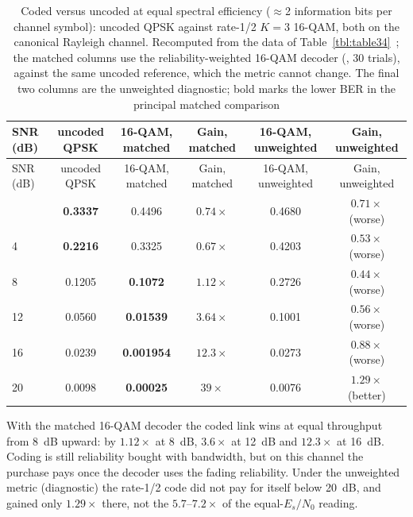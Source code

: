 {\small\setlength{\tabcolsep}{2pt}\begin{longtable}[]{@{}lccccc@{}}
\caption[Coded versus uncoded at equal spectral efficiency]{Coded versus uncoded at equal spectral efficiency ($\approx$2 information bits per channel symbol): uncoded QPSK against rate-1/2 $K{=}3$ 16-QAM, both on the canonical Rayleigh channel. Recomputed from the data of Table~\ref{tbl:table34}~; the matched columns use the reliability-weighted 16-QAM decoder (, 30 trials), against the same uncoded reference, which the metric cannot change. The final two columns are the unweighted diagnostic; bold marks the lower BER in the principal matched comparison}\label{tbl:table40}\tabularnewline
\toprule\noalign{}
SNR (dB) & uncoded QPSK & 16-QAM, matched & Gain, matched & 16-QAM, unweighted & Gain, unweighted \\
\midrule\noalign{}
\endfirsthead
\toprule\noalign{}
SNR (dB) & uncoded QPSK & 16-QAM, matched & Gain, matched & 16-QAM, unweighted & Gain, unweighted \\
\midrule\noalign{}
\endhead
\bottomrule\noalign{}
\endlastfoot
0 & \textbf{0.3337} & 0.4496 & $0.74\times$ & 0.4680 & $0.71\times$ (worse) \\
4 & \textbf{0.2216} & 0.3325 & $0.67\times$ & 0.4203 & $0.53\times$ (worse) \\
8 & 0.1205 & \textbf{0.1072} & $1.12\times$ & 0.2726 & $0.44\times$ (worse) \\
12 & 0.0560 & \textbf{0.01539} & $3.64\times$ & 0.1001 & $0.56\times$ (worse) \\
16 & 0.0239 & \textbf{0.001954} & $12.3\times$ & 0.0273 & $0.88\times$ (worse) \\
20 & 0.0098 & \textbf{0.00025} & $39\times$ & 0.0076 & $1.29\times$ (better) \\
\end{longtable}}

With the matched 16-QAM decoder the coded link wins at equal throughput from 8~dB upward: by $1.12\times$ at 8~dB, $3.6\times$ at 12~dB and $12.3\times$ at 16~dB. Coding is still reliability bought with bandwidth, but on this channel the purchase pays once the decoder uses the fading reliability. Under the unweighted metric (diagnostic) the rate-1/2 code did not pay for itself below 20~dB, and gained only $1.29\times$ there, not the $5.7$--$7.2\times$ of the equal-$E_s/N_0$ reading.

